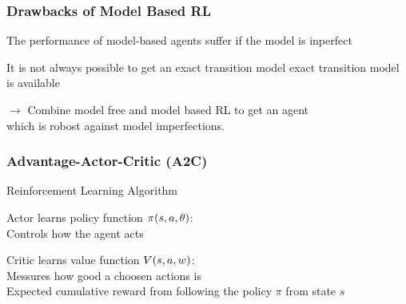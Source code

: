 \begin{frame}
    \frametitle{Drawbacks of Model Based RL}


\begin{PraesentationAufzaehlung}
    \item The performance of model-based agents suffer if the model is inperfect\\
    \item It is not always possible to get an exact transition model
exact transition model is available
\end{PraesentationAufzaehlung}

$\rightarrow$ Combine model free and model based RL to get an agent\\
\hspace{8mm} which is robost against model imperfections.
\end{frame}
\clearpage


\begin{frame}
    \frametitle{Advantage-Actor-Critic (A2C)}

Reinforcement Learning Algorithm
\begin{PraesentationAufzaehlung}
	\item Actor	learns policy function $\mathnormal{\pi(s, a, \theta)}$:\\
	Controls how the agent acts\\	
	\item Critic learns value function $\mathnormal{V(s, a, w)}$:\\
	Messures how good a choosen actions is\\
 	Expected cumulative reward from following the policy $\pi$ from state $s$	
\end{PraesentationAufzaehlung}



\end{frame}
\clearpage



